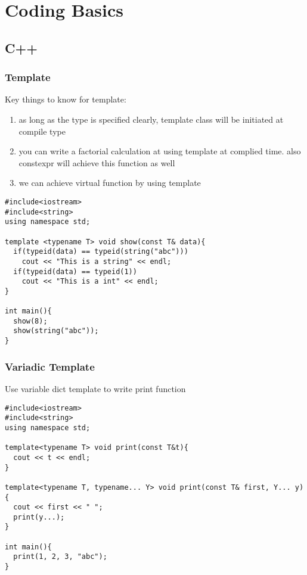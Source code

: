 \newpage
\section{Coding Basics}
\subsection{C++}
\subsubsection{Template}

Key things to know for template:
\begin{enumerate}
\item as long as the type is specified clearly, template class will be initiated at compile type
\item you can write a factorial calculation at using template at complied time. also {\color{blue}constexpr} will achieve this function as well
\item we can achieve virtual function by using template
\end{enumerate}

\begin{lstlisting}
#include<iostream>
#include<string>
using namespace std;

template <typename T> void show(const T& data){
  if(typeid(data) == typeid(string("abc")))
    cout << "This is a string" << endl;
  if(typeid(data) == typeid(1))
    cout << "This is a int" << endl;
}

int main(){
  show(8);
  show(string("abc"));
}
\end{lstlisting}

\subsubsection{Variadic Template}

Use variable dict template to write print function

\begin{lstlisting}
#include<iostream>
#include<string>
using namespace std;

template<typename T> void print(const T&t){
  cout << t << endl;
}

template<typename T, typename... Y> void print(const T& first, Y... y){
  cout << first << " ";
  print(y...);
}

int main(){
  print(1, 2, 3, "abc");
}
\end{lstlisting}

